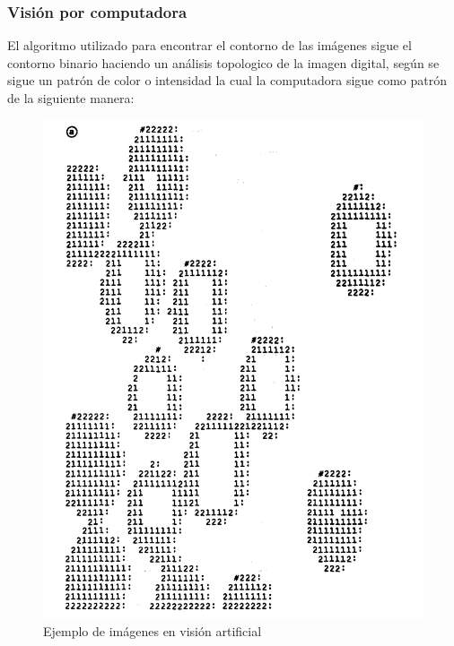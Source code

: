 \documentclass{article}
\begin{document}
\subsubsection{Visión por computadora}
El algoritmo utilizado para encontrar el contorno de las imágenes sigue el contorno binario haciendo
un análisis topologico de la imagen digital, según \cite{test} se sigue un patrón de color o intensidad
la cual la computadora sigue como patrón de la siguiente manera:
\begin{figure}[H]
\caption{Ejemplo de imágenes en visión artificial}
\centering
\includegraphics[scale=.15]{a}
\end{figure}
\end{document}
